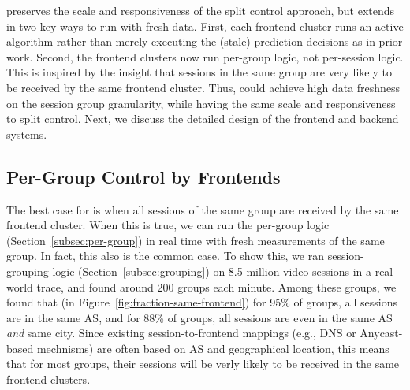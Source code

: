  \name  preserves the scale and responsiveness of the split control
approach, but extends  in  two key ways to run  \idea with fresh data. First,
each frontend cluster runs  an active \mab algorithm rather than merely
executing the (stale) prediction decisions as in prior work.  Second, the
frontend clusters now run per-group logic, not per-session logic.  This is
inspired by the insight that sessions in the same group are very likely to be
received by the same frontend cluster.  Thus, \idea could achieve high data
freshness on the session group granularity, while having the same scale and
responsiveness to split control.
Next, we discuss the detailed design of the frontend and backend 
 systems. 
 

 

\subsection{Per-Group Control by Frontends}
\label{subsec:frontend}


The best case for \idea is when all sessions of the same group are received by
the same frontend cluster.  When this is true, we can run the per-group \mab
logic (Section~\ref{subsec:per-group}) in real time with fresh measurements of
the same group.  In fact, this also is the common case.  To show this, we ran
session-grouping logic (Section~\ref{subsec:grouping}) on 8.5 million video
sessions in a real-world trace, and found around 200 groups each minute. Among these groups, we found that (in
Figure~\ref{fig:fraction-same-frontend}) for 95\% of groups, all sessions are
in the same AS, and for 88\% of groups, all sessions are even in the same AS
{\em and} same city.  Since existing session-to-frontend mappings (e.g., DNS or Anycast-based mechnisms) 
are often based on AS
and geographical location, this means that for most groups, their sessions will
be verly likely to be received in the same frontend clusters.



